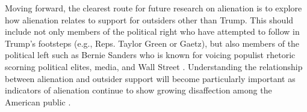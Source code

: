 \documentclass[12pt]{article}
\begin{document}
Moving forward, the clearest route for future research on alienation is to explore how alienation relates to support for outsiders other than Trump. This should include not only members of the political right who have attempted to follow in Trump's footsteps (e.g., Reps. Taylor Green or Gaetz), but also members of the political left such as Bernie Sanders who is known for voicing populist rhetoric scorning political elites, media, and Wall Street \parencite{sullivan2020trump}. Understanding the relationship between alienation and outsider support will become particularly important as indicators of alienation continue to show growing disaffection among the American public \parencite{citrin2018political}.






































\clearpage
\begin{refcontext}[sorting=nyt]
\printbibliography
\end{refcontext}


\clearpage
\appendix
\end{document}
